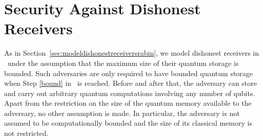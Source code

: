 \section{Security Against Dishonest Receivers} \label{sec:modeldishonestreceivers}
As in Section~\ref{sec:modeldishonestreceiversrabin}, we model
dishonest receivers 
in \Randlqot\ under the assumption that the
maximum size of their quantum storage is bounded.  Such adversaries
are only required to have bounded quantum storage when Step
\ref{bound} in \Randlqot\ is reached. Before and after that, the
adversary can store and carry out arbitrary quantum computations
involving any number of qubits. Apart from the restriction on the size
of the quantum memory available to the adversary, no other assumption
is made. In particular, the adversary is not assumed to be
computationally bounded and the size of its classical memory is not
restricted.

